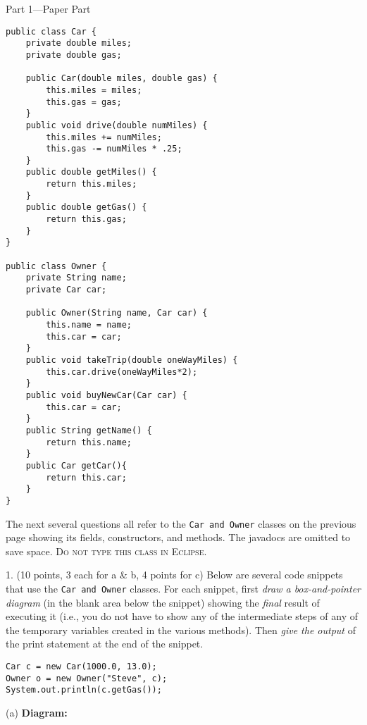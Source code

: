 \documentclass[12pt,twoside]{article}
\newcommand{\code}[1]{\texttt{#1}}
\begin{document}
{\Large Part 1---Paper Part}

\begin{center}
\begin{minipage}[t]{0.9\linewidth}
\begin{lstlisting}
public class Car {
	private double miles;
	private double gas;
	
	public Car(double miles, double gas) {
		this.miles = miles;
		this.gas = gas;
	}
	public void drive(double numMiles) {
		this.miles += numMiles;
		this.gas -= numMiles * .25;
	}
	public double getMiles() {
		return this.miles;
	}
	public double getGas() {
		return this.gas;
	}
}

public class Owner {
	private String name;
	private Car car;
	
	public Owner(String name, Car car) {
		this.name = name;
		this.car = car;
	}
	public void takeTrip(double oneWayMiles) {
		this.car.drive(oneWayMiles*2);
	}
	public void buyNewCar(Car car) {
		this.car = car;
	}
	public String getName() {
		return this.name;
	}
	public Car getCar(){
		return this.car;
	}
}

\end{lstlisting}
\end{minipage}
\end{center}
\clearpage

The next several questions all refer to the \code{Car and Owner} classes on the previous page showing its fields, constructors, and methods.  The javadocs are omitted to save space. \textsc{Do not type this class in Eclipse}.

1. (10 points, 3 each for a \& b, 4 points for c) Below are several code snippets that use the \code{Car and Owner} classes.  For each snippet, first 
\emph{draw a box-and-pointer diagram} (in the blank area below the snippet) showing the \emph{final} result of executing it (i.e., you do not have to show any of the intermediate steps of any of the temporary variables created in the various methods).  Then \emph{give the output} of the print statement at the end of the snippet. 

\begin{minipage}[t]{0.68\linewidth}
\begin{lstlisting}
Car c = new Car(1000.0, 13.0);
Owner o = new Owner("Steve", c);
System.out.println(c.getGas());
\end{lstlisting}
\end{minipage}
\hspace{3.25in}
\begin{minipage}[t]{0.3\linewidth}
\vspace*{1 mm} 
\end{minipage}
(a) \textbf{Diagram:}
\end{document}
